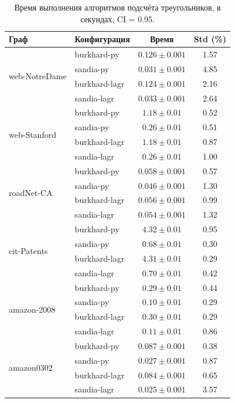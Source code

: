 \documentclass[a4paper]{article}
\begin{document}
\begin{table}[h!]
    \centering
    \small
    \caption{Время выполнения алгоритмов подсчёта треугольников, в секундах, CI = 0.95.}
    \label{tab:benchmarks}
    \begin{tabular}{llcc}
        \toprule
        \textbf{Граф} & \textbf{Конфигурация} & \textbf{Время} & \textbf{Std (\%)} \\
        \midrule
        \multirow{4}{*}{web-NotreDame}
            & burkhard-py   & $0.126 \pm 0.001$ & 1.57 \\
            & sandia-py     & $0.031 \pm 0.001$ & 4.85 \\
            & burkhard-lagr & $0.124 \pm 0.001$ & 2.16 \\
            & sandia-lagr   & $0.033 \pm 0.001$ & 2.64 \\
        \midrule
        \multirow{4}{*}{web-Stanford}
            & burkhard-py   & $1.18 \pm 0.01$ & 0.52 \\
            & sandia-py     & $0.26 \pm 0.01$ & 0.51 \\
            & burkhard-lagr & $1.18 \pm 0.01$ & 0.87 \\
            & sandia-lagr   & $0.26 \pm 0.01$ & 1.00 \\
        \midrule
        \multirow{4}{*}{roadNet-CA}
            & burkhard-py   & $0.058 \pm 0.001$ & 0.57 \\
            & sandia-py     & $0.046 \pm 0.001$ & 1.30 \\
            & burkhard-lagr & $0.056 \pm 0.001$ & 0.99 \\
            & sandia-lagr   & $0.054 \pm 0.001$ & 1.32 \\
        \midrule
        \multirow{4}{*}{cit-Patents}
            & burkhard-py   & $4.32 \pm 0.01$  & 0.95 \\
            & sandia-py     & $0.68 \pm 0.01$  & 0.30 \\
            & burkhard-lagr & $4.31 \pm 0.01$  & 0.29 \\
            & sandia-lagr   & $0.70 \pm 0.01$  & 0.42 \\
        \midrule
        \multirow{4}{*}{amazon-2008}
            & burkhard-py   & $0.29 \pm 0.01$ & 0.44 \\
            & sandia-py     & $0.10 \pm 0.01$ & 0.29 \\
            & burkhard-lagr & $0.30 \pm 0.01$ & 0.29 \\
            & sandia-lagr   & $0.11 \pm 0.01$ & 0.86 \\
        \midrule
        \multirow{4}{*}{amazon0302}
            & burkhard-py   & $0.087 \pm 0.001$ & 0.38 \\
            & sandia-py     & $0.027 \pm 0.001$ & 0.87 \\
            & burkhard-lagr & $0.084 \pm 0.001$ & 0.65 \\
            & sandia-lagr   & $0.025 \pm 0.001$ & 3.57 \\
        \bottomrule
    \end{tabular}
\end{table}
\end{document}
